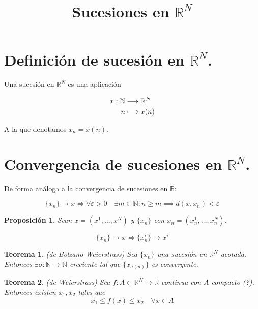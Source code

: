 \documentclass[11pt]{article}
\title{\textbf{Sucesiones en $\mathbb{R}^N$}}
\date{}
\newtheorem{theorem}{Teorema}
\newtheorem{fact}{Proposición}
\newtheorem{proofs}{Demostración}
\begin{document}
\maketitle

\section*{Definición de sucesión en $\mathbb{R}^N$.}

Una sucesión en $\mathbb{R}^N$ es una aplicación 

\begin{align}
&x : \mathbb{N} \longrightarrow { \mathbb{R}^N }\notag \\
&\quad\;\; n \longmapsto { x(n) }\notag
\end{align}

A la que denotamos $x_n = x(n)$.

\section*{Convergencia de sucesiones en $\mathbb{R}^N$.}

De forma análoga a la convergencia de sucesiones en $\mathbb{R}$:

\[
	\{x_n\} \rightarrow x \iff \forall \varepsilon > 0\quad \exists m\in\mathbb{N} : n \ge m \implies d(x,x_n) < \varepsilon
\]

\begin{fact}
	Sean $x = (x^1, \dots, x^N)$ y $\{x_n\}$ con $x_n = (x^1_n, \dots, x^N_n)$.
	
	\[
		\{x_n\} \rightarrow x \iff \{x^i_n\} \rightarrow x^i
	\]
\end{fact}




\begin{theorem} (de Bolzano-Weierstrass)
Sea $\{x_n\}$ una sucesión en $\mathbb{R}^N$ acotada. Entonces $\exists \sigma : \mathbb{N} \longrightarrow \mathbb{N}$ creciente tal que $\{x_{\sigma(n)}\}$ es convergente.
\end{theorem}

\begin{theorem} (de Weierstrass)
	Sea $f : A \subset \mathbb{R}^N \longrightarrow \mathbb{R}$ continua con $A$ compacto (?). Entonces existen $x_1,x_2$ tales que
	\[
		x_1 \le f(x) \le x_2\quad \forall x \in A 
	\]
\end{theorem}
\end{document}
